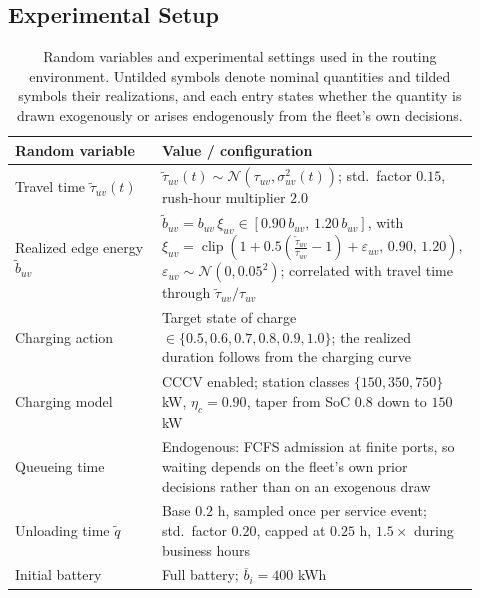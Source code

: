 \documentclass[a4paper,fleqn]{cas-sc}
\begin{document}
\subsection{Experimental Setup}

\begin{table}[t]
\centering
\caption{Random variables and experimental settings used in the routing environment. Untilded symbols denote nominal quantities and tilded symbols their realizations, and each entry states whether the quantity is drawn exogenously or arises endogenously from the fleet's own decisions.}
\label{tab:random_variables}
\small
\begin{tabular}{p{0.31\linewidth} p{0.61\linewidth}}
\toprule
\textbf{Random variable} & \textbf{Value / configuration} \\
\midrule
Travel time $\tilde{\tau}_{uv}(t)$
& $\tilde{\tau}_{uv}(t)\sim 
\mathcal{N}\!\left(\tau_{uv},\sigma_{uv}^{2}(t)\right)$; 
std.\ factor $0.15$, rush-hour multiplier $2.0$ \\

Realized edge energy $\tilde{b}_{uv}$
&
$\tilde{b}_{uv}=b_{uv}\,\xi_{uv}\in[0.90\,b_{uv},\,1.20\,b_{uv}]$, with
$\xi_{uv}=\operatorname{clip}\!\left(
1+0.5\!\left(\frac{\tilde{\tau}_{uv}}{\tau_{uv}}-1\right)
+\varepsilon_{uv},\,0.90,\,1.20
\right)$, $\varepsilon_{uv}\sim\mathcal{N}\!\left(0,0.05^{2}\right)$;
correlated with travel time through $\tilde{\tau}_{uv}/\tau_{uv}$ \\

Charging action
& Target state of charge $\in\{0.5,0.6,0.7,0.8,0.9,1.0\}$; the realized
duration follows from the charging curve \\

Charging model
& CCCV enabled; station classes $\{150,350,750\}$ kW, $\eta_c=0.90$,
taper from SoC $0.8$ down to $150$ kW \\

Queueing time
& Endogenous: FCFS admission at finite ports, so waiting depends on the
fleet's own prior decisions rather than on an exogenous draw \\

Unloading time $\tilde{q}$
& Base $0.2$ h, sampled once per service event; std.\ factor $0.20$,
capped at $0.25$ h, $1.5\times$ during business hours \\

Initial battery
& Full battery; $\overline{b}_i=400$ kWh \\
\bottomrule
\end{tabular}
\end{table}
\end{document}
